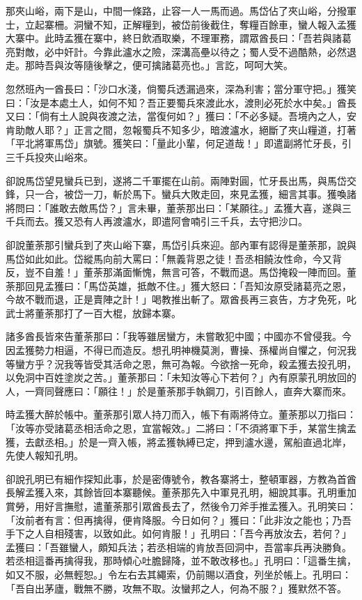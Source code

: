 那夾山峪，兩下是山，中間一條路，止容一人一馬而過。馬岱佔了夾山峪，分撥軍士，立起寨柵。洞蠻不知，正解糧到，被岱前後截住，奪糧百餘車，蠻人報入孟獲大寨中。此時孟獲在寨中，終日飲酒取樂，不理軍務，謂眾酋長曰：「吾若與諸葛亮對敵，必中奸計。今靠此瀘水之險，深溝高壘以待之；蜀人受不過酷熱，必然退走。那時吾與汝等隨後擊之，便可擒諸葛亮也。」言訖，呵呵大笑。

忽然班內一酋長曰：「沙口水淺，倘蜀兵透漏過來，深為利害；當分軍守把。」獲笑曰：「汝是本處土人，如何不知？吾正要蜀兵來渡此水，渡則必死於水中矣。」酋長又曰：「倘有土人說與夜渡之法，當復何如？」獲曰：「不必多疑。吾境內之人，安肯助敵人耶？」正言之間，忽報蜀兵不知多少，暗渡瀘水，絕斷了夾山糧道，打著「平北將軍馬岱」旗號。獲笑曰：「量此小輩，何足道哉！」即遣副將忙牙長，引三千兵投夾山峪來。

卻說馬岱望見蠻兵已到，遂將二千軍擺在山前。兩陣對圓，忙牙長出馬，與馬岱交鋒，只一合，被岱一刀，斬於馬下。蠻兵大敗走回，來見孟獲，細言其事。獲喚諸將問曰：「誰敢去敵馬岱？」言未畢，董荼那出曰：「某願往。」孟獲大喜，遂與三千兵而去。獲又恐有人再渡瀘水，即遣阿會喃引三千兵，去守把沙口。

卻說董荼那引蠻兵到了夾山峪下寨，馬岱引兵來迎。部內軍有認得是董荼那，說與馬岱如此如此。岱縱馬向前大罵曰：「無義背恩之徒！吾丞相饒汝性命，今又背反，豈不自羞！」董荼那滿面慚愧，無言可答，不戰而退。馬岱掩殺一陣而回。董荼那回見孟獲曰：「馬岱英雄，抵敵不住。」獲大怒曰：「吾知汝原受諸葛亮之恩，今故不戰而退，正是賣陣之計！」喝教推出斬了。眾酋長再三哀告，方才免死，叱武士將董荼那打了一百大棍，放歸本寨。

諸多酋長皆來告董荼那曰：「我等雖居蠻方，未嘗敢犯中國；中國亦不曾侵我。今因孟獲勢力相逼，不得已而造反。想孔明神機莫測，曹操、孫權尚自懼之，何況我等蠻方乎？況我等皆受其活命之恩，無可為報。今欲捨一死命，殺孟獲去投孔明，以免洞中百姓塗炭之苦。」董荼那曰：「未知汝等心下若何？」內有原蒙孔明放回的人，一齊同聲應曰：「願往！」於是董荼那手執鋼刀，引百餘人，直奔大寨而來。

時孟獲大醉於帳中。董荼那引眾人持刀而入，帳下有兩將侍立。董荼那以刀指曰：「汝等亦受諸葛丞相活命之恩，宜當報效。」二將曰：「不須將軍下手，某當生擒孟獲，去獻丞相。」於是一齊入帳，將孟獲執縛已定，押到瀘水邊，駕船直過北岸，先使人報知孔明。

卻說孔明已有細作探知此事，於是密傳號令，教各寨將士，整頓軍器，方教為首酋長解孟獲入來，其餘皆回本寨聽候。董荼那先入中軍見孔明，細說其事。孔明重加賞勞，用好言撫慰，遣董荼那引眾酋長去了，然後令刀斧手推孟獲入。孔明笑曰：「汝前者有言：但再擒得，便肯降服。今日如何？」獲曰：「此非汝之能也；乃吾手下之人自相殘害，以致如此。如何肯服！」孔明曰：「吾今再放汝去，若何？」孟獲曰：「吾雖蠻人，頗知兵法；若丞相端的肯放吾回洞中，吾當率兵再決勝負。若丞相這番再擒得我，那時傾心吐膽歸降，並不敢改移也。」孔明曰：「這番生擒，如又不服，必無輕恕。」令左右去其繩索，仍前賜以酒食，列坐於帳上。孔明曰：「吾自出茅廬，戰無不勝，攻無不取。汝蠻邦之人，何為不服？」獲默然不答。

